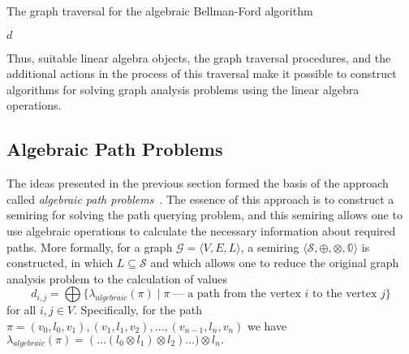 \begin{algorithm}
\begin{algorithmic}[1]
\caption{The graph traversal for the algebraic Bellman-Ford algorithm}
\label{lst:bford2}
    \EndFor
        \State \Return {}
    \EndIf
    \State \Return $d$
\EndFunction
\end{algorithmic}
\end{algorithm}

Thus, suitable linear algebra objects, the graph traversal procedures, and the additional actions in the process of this traversal make it possible to construct algorithms for solving graph analysis problems using the linear algebra operations.

\subsection{Algebraic Path Problems}
The ideas presented in the previous section formed the basis of the approach called \textit{algebraic path problems}~\cite{rote1990path}. The essence of this approach is to construct a semiring for solving the path querying problem, and this semiring allows one to use algebraic operations to calculate the necessary information about required paths. More formally, for a graph $\mathcal{G} = \langle V, E, L \rangle$, a semiring $\langle \mathcal{S}, \oplus, \otimes, \mathbb{0} \rangle$ is constructed, in which $L \subseteq \mathcal{S}$ and which allows one to reduce the original graph analysis problem to the calculation of values $$d_{i,j} = \bigoplus \{\lambda_{algebraic}(\pi) \mid \pi~\text{--- a path from the vertex $i$ to the vertex $j$}\}$$ for all $i, j \in V$. Specifically, for the path $\pi = (v_0, l_0, v_1), (v_1, l_1, v_2), \ldots, (v_{n - 1}, l_n, v_n)$ we have $\lambda_{algebraic}(\pi) = (\ldots (l_0 \otimes l_1) \otimes l_2) \ldots ) \otimes l_n.$

